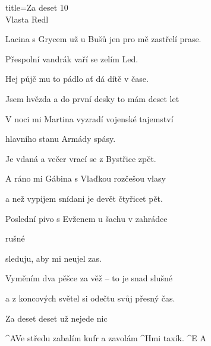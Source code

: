 \begin{song}{title=\predtitle\centering Za deset 10 \\\large Vlasta Redl  \vspace*{-0.3cm}}
\begin{centerjustified}
\begin{varwidth}[t]{0.50\textwidth}
	Lacina s Grycem už u Bušů jen pro mě zastřelí prase.

	Přespolní vandrák vaří se zelím Led.
	
	Hej půjč mu to pádlo ať dá dítě v čase.
	
	Jsem hvězda a do první desky to mám deset let


\end{varwidth}\mezisloupci\begin{varwidth}[t]{0.55\textwidth}\setlength{\parindent}{0.05cm}
\vspace*{0.0525cm}  %

\sloka
	V noci mi Martina vyzradí vojenské tajemství
	
	hlavního stanu Armády spásy.
	
	Je vdaná a večer vrací se z Bystřice zpět.
	
	A ráno mi Gábina s Vlaďkou rozčešou vlasy
	
	a než vypijem snídani je devět čtyřicet pět.
	

\sloka
	Poslední pivo s Evženem u šachu v zahrádce

	rušné

	sleduju, aby mi neujel zas.

	Vyměním dva pěšce za věž -- to je snad slušné

	a z koncových světel si odečtu svůj přesný čas.

	Za deset deset už nejede nic

	^{A}Ve středu zabalím kufr a zavolám ^{Hmi \z}taxík. ^{E A}

\end{varwidth}
\end{centerjustified}
\setcounter{Slokočet}{0}
\end{song}
